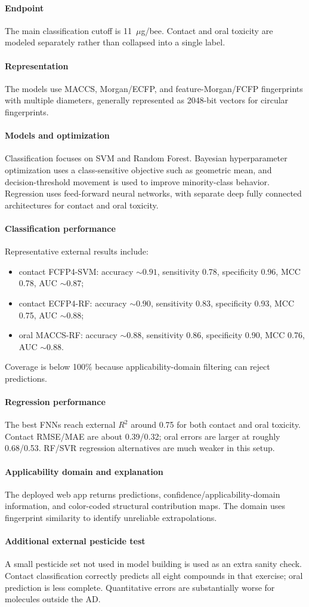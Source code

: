 \documentclass[11pt]{article}
\newcommand{\reviewfield}[2]{\paragraph{#1}#2}
\begin{document}
\reviewfield{Endpoint}{
The main classification cutoff is 11~$\mu$g/bee. Contact and oral toxicity are modeled separately rather than collapsed into a single label.
}

\reviewfield{Representation}{
The models use MACCS, Morgan/ECFP, and feature-Morgan/FCFP fingerprints with multiple diameters, generally represented as 2048-bit vectors for circular fingerprints.
}

\reviewfield{Models and optimization}{
Classification focuses on SVM and Random Forest. Bayesian hyperparameter optimization uses a class-sensitive objective such as geometric mean, and decision-threshold movement is used to improve minority-class behavior. Regression uses feed-forward neural networks, with separate deep fully connected architectures for contact and oral toxicity.
}

\reviewfield{Classification performance}{
Representative external results include:
\begin{itemize}
    \item contact FCFP4-SVM: accuracy $\sim0.91$, sensitivity 0.78, specificity 0.96, MCC 0.78, AUC $\sim0.87$;
    \item contact ECFP4-RF: accuracy $\sim0.90$, sensitivity 0.83, specificity 0.93, MCC 0.75, AUC $\sim0.88$;
    \item oral MACCS-RF: accuracy $\sim0.88$, sensitivity 0.86, specificity 0.90, MCC 0.76, AUC $\sim0.88$.
\end{itemize}
Coverage is below 100\% because applicability-domain filtering can reject predictions.
}

\reviewfield{Regression performance}{
The best FNNs reach external $R^2$ around 0.75 for both contact and oral toxicity. Contact RMSE/MAE are about 0.39/0.32; oral errors are larger at roughly 0.68/0.53. RF/SVR regression alternatives are much weaker in this setup.
}

\reviewfield{Applicability domain and explanation}{
The deployed web app returns predictions, confidence/applicability-domain information, and color-coded structural contribution maps. The domain uses fingerprint similarity to identify unreliable extrapolations.
}

\reviewfield{Additional external pesticide test}{
A small pesticide set not used in model building is used as an extra sanity check. Contact classification correctly predicts all eight compounds in that exercise; oral prediction is less complete. Quantitative errors are substantially worse for molecules outside the AD.
}
\end{document}

